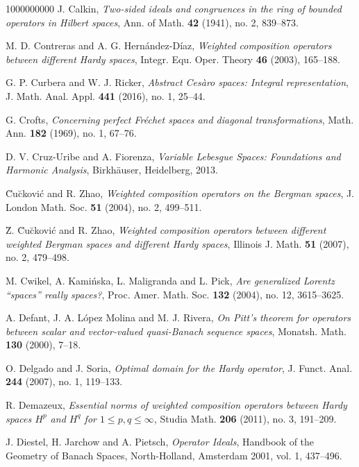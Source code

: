 \documentclass[11pt]{amsart}
\theoremstyle{definition}
\theoremstyle{definition}
\theoremstyle{definition}
\theoremstyle{definition}
\theoremstyle{definition}
\theoremstyle{definition}
\theoremstyle{definition}
\theoremstyle{definition}
\numberwithin{equation}{section}
\numberwithin{equation}{section}
\numberwithin{equation}{section}
\theoremstyle{definition}
\theoremstyle{definition}
\theoremstyle{definition}
\theoremstyle{definition}
\theoremstyle{definition}
\theoremstyle{definition}
\begin{document}
\begin{thebibliography}{1000000000}
	 J. Calkin, {\it Two-sided ideals and congruences in the ring of bounded operators in Hilbert spaces}, Ann. of Math. {\bf 42} (1941), no. 2, 839--873.
	
	 M. D. Contreras and A. G. Hern{\' a}ndez-D{\' i}az, {\it Weighted composition operators between different Hardy spaces},
		Integr. Equ. Oper. Theory {\bf 46} (2003), 165--188.
	
	 G. P. Curbera and W. J. Ricker, {\it Abstract Ces{\` a}ro spaces: Integral representation}, J. Math. Anal. Appl. {\bf 441} (2016), no. 1, 25--44.
	
	 G. Crofts, {\it Concerning perfect Fr{\' e}chet spaces and diagonal transformations}, Math. Ann. {\bf 182} (1969), no. 1, 67--76.
	
	 D. V. Cruz-Uribe and A. Fiorenza, {\it Variable Lebesgue Spaces: Foundations and Harmonic Analysis}, Birkh{\" a}user, Heidelberg, 2013.
	
	 {\u C}u{\u c}kovi{\' c} and R. Zhao, {\it Weighted composition operators on the Bergman spaces}, J. London Math. Soc. {\bf 51} (2004), no. 2, 499--511.
		
	 {\u Z}. {\u C}u{\u c}kovi{\' c} and R. Zhao, {\it Weighted composition operators between different weighted Bergman spaces and different Hardy spaces},
		Illinois J. Math. {\bf 51} (2007), no. 2, 479--498.
		
	 M. Cwikel, A. Kami{\' n}ska, L. Maligranda and L. Pick, {\it Are generalized Lorentz \enquote{spaces} really spaces?}, Proc. Amer. Math. Soc. {\bf 132} (2004),
		no. 12, 3615--3625.
		
	 A. Defant, J. A. L{\' o}pez Molina and M. J. Rivera, {\it On Pitt's theorem for operators between scalar and vector-valued quasi-Banach sequence spaces},
	Monatsh. Math. {\bf 130} (2000), 7--18.
		
	 O. Delgado and J. Soria, \textit{Optimal domain for the Hardy operator}, J. Funct. Anal. {\bf 244} (2007), no. 1, 119--133.
	
	 R. Demazeux, {\it Essential norms of weighted composition operators between Hardy spaces $H^p$ and $H^q$ for $1 \leq p,q \leq \infty$}, Studia Math. {\bf 206} (2011),
	no. 3, 191--209.
	
	 J. Diestel, H. Jarchow and A. Pietsch, {\it Operator Ideals}, Handbook of the Geometry of Banach Spaces, North-Holland, Amsterdam 2001, vol. 1, 437--496.
	

\end{thebibliography}
\end{document}
